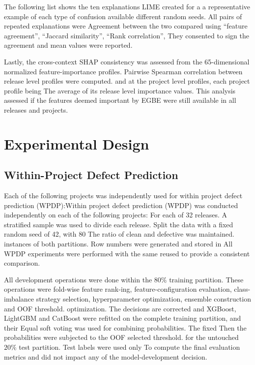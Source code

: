 \documentclass[conference]{IEEEtran}
\begin{document}
The following list shows the ten explanations LIME created for a
a representative example of each type of confusion available
different random seeds. All pairs of repeated explanations were
Agreement between the two compared using “feature agreement”, “Jaccard similarity”, “Rank correlation”,
They consented to sign the agreement and mean values were reported.

Lastly, the cross-context SHAP consistency was assessed from the
65-dimensional normalized feature-importance profiles. Pairwise
Spearman correlation between release level profiles were computed.
and at the project level profiles, each project profile being
The average of its release level importance values. This analysis
assessed if the features deemed important by EGBE were still
available in all releases and projects.

\section{Experimental Design}

\subsection{Within-Project Defect Prediction}
\label{subsec:wpdp}

Each of the following projects was independently used for within project defect prediction (WPDP):Within project defect prediction (WPDP) was conducted independently on each of the following projects:
For each of 32 releases. A stratified sample was used to divide each release.
Split the data with a fixed random seed of 42, with 80%
The ratio of clean and defective was maintained.
instances of both partitions. Row numbers were generated and stored in
All WPDP experiments were performed with the same reused to provide a consistent comparison.

All development operations were done within the \(80\%\) training
partition. These operations were fold-wise feature rank-ing,
feature-configuration evaluation, class-imbalance strategy selection,
hyperparameter optimization, ensemble construction and OOF threshold.
optimization. The decisions are corrected and XGBoost, LightGBM and
CatBoost were refitted on the complete training partition, and their
Equal soft voting was used for combining probabilities. The fixed
Then the probabilities were subjected to the OOF selected threshold.
for the untouched \(20\%\) test partition. Test labels were used only
To compute the final evaluation metrics and did not impact any of the
model-development decision.
\end{document}
